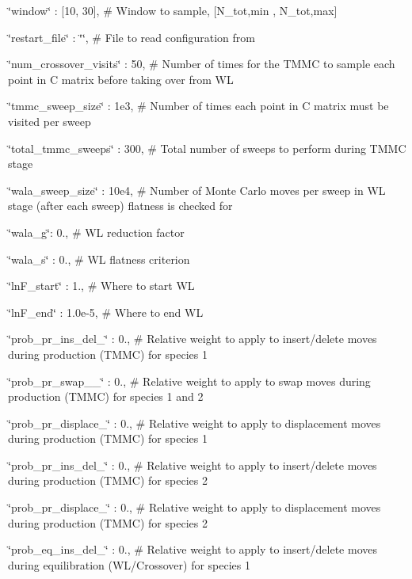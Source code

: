 \char`\"{}window\char`\"{} \-: \mbox{[}10, 30\mbox{]}, \# Window to sample, \mbox{[}N\-\_\-tot,min , N\-\_\-tot,max\mbox{]}

\char`\"{}restart\-\_\-file\char`\"{} \-: \char`\"{}\char`\"{}, \# File to read configuration from

\char`\"{}num\-\_\-crossover\-\_\-visits\char`\"{} \-: 50, \# Number of times for the T\-M\-M\-C to sample each point in C matrix before taking over from W\-L

\char`\"{}tmmc\-\_\-sweep\-\_\-size\char`\"{} \-: 1e3, \# Number of times each point in C matrix must be visited per sweep

\char`\"{}total\-\_\-tmmc\-\_\-sweeps\char`\"{} \-: 300, \# Total number of sweeps to perform during T\-M\-M\-C stage

\char`\"{}wala\-\_\-sweep\-\_\-size\char`\"{} \-: 10e4, \# Number of Monte Carlo moves per sweep in W\-L stage (after each sweep) flatness is checked for

\char`\"{}wala\-\_\-g\char`\"{}\-: 0., \# W\-L reduction factor

\char`\"{}wala\-\_\-s\char`\"{} \-: 0., \# W\-L flatness criterion

\char`\"{}ln\-F\-\_\-start\char`\"{} \-: 1., \# Where to start W\-L

\char`\"{}ln\-F\-\_\-end\char`\"{} \-: 1.\-0e-\/5, \# Where to end W\-L

\char`\"{}prob\-\_\-pr\-\_\-ins\-\_\-del\-\_\char`\"{} \-: 0., \# Relative weight to apply to insert/delete moves during production (T\-M\-M\-C) for species 1

\char`\"{}prob\-\_\-pr\-\_\-swap\-\_\-\_\char`\"{} \-: 0., \# Relative weight to apply to swap moves during production (T\-M\-M\-C) for species 1 and 2

\char`\"{}prob\-\_\-pr\-\_\-displace\-\_\char`\"{} \-: 0., \# Relative weight to apply to displacement moves during production (T\-M\-M\-C) for species 1

\char`\"{}prob\-\_\-pr\-\_\-ins\-\_\-del\-\_\char`\"{} \-: 0., \# Relative weight to apply to insert/delete moves during production (T\-M\-M\-C) for species 2

\char`\"{}prob\-\_\-pr\-\_\-displace\-\_\char`\"{} \-: 0., \# Relative weight to apply to displacement moves during production (T\-M\-M\-C) for species 2

\char`\"{}prob\-\_\-eq\-\_\-ins\-\_\-del\-\_\char`\"{} \-: 0., \# Relative weight to apply to insert/delete moves during equilibration (W\-L/\-Crossover) for species 1


